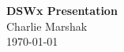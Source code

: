 \documentclass[8pt]{beamer}
\begin{document}
\begin{frame}
\begin{center}
\textbf{DSWx Presentation}\\
\vspace{.5cm}
Charlie Marshak \\

\today\\
\end{center}
\end{frame}





\end{document}
